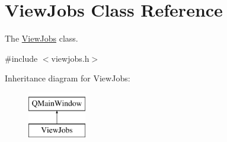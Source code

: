 \hypertarget{class_view_jobs}{}\section{View\+Jobs Class Reference}
\label{class_view_jobs}


The \mbox{\hyperlink{class_view_jobs}{View\+Jobs}} class.  




{\ttfamily \#include $<$viewjobs.\+h$>$}

Inheritance diagram for View\+Jobs\+:\begin{figure}[H]
\begin{center}
\leavevmode
\includegraphics[height=2.000000cm]{class_view_jobs}
\end{center}
\end{figure}
